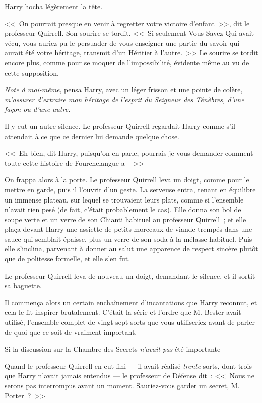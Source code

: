 Harry hocha légèrement la tête.

<<~On pourrait presque en venir à regretter votre victoire d'enfant~>>, dit le professeur Quirrell. Son sourire se tordit. <<~Si seulement Vous-Savez-Qui avait vécu, vous auriez pu le persuader de vous enseigner une partie du savoir qui aurait été votre héritage, transmit d'un Héritier à l'autre.~>> Le sourire se tordit encore plus, comme pour se moquer de l'impossibilité, évidente même au vu de cette supposition.

\emph{Note à moi-même}, pensa Harry, avec un léger frisson et une pointe de colère, \emph{m'assurer d'extraire mon héritage de l'esprit du Seigneur des Ténèbres, d'une façon ou d'une autre.}

Il y eut un autre silence. Le professeur Quirrell regardait Harry comme s'il attendait à ce que ce dernier lui demande quelque chose.

<<~Eh bien, dit Harry, puisqu'on en parle, pourrais-je vous demander comment toute cette histoire de Fourchelangue a -~>>

On frappa alors à la porte. Le professeur Quirrell leva un doigt, comme pour le mettre en garde, puis il l'ouvrit d'un geste. La serveuse entra, tenant en équilibre un immense plateau, sur lequel se trouvaient leurs plats, comme si l'ensemble n'avait rien pesé (de fait, c'était probablement le cas). Elle donna son bol de soupe verte et un verre de son Chianti habituel au professeur Quirrell~; et elle plaça devant Harry une assiette de petits morceaux de viande trempés dans une sauce qui semblait épaisse, plus un verre de son soda à la mélasse habituel. Puis elle s'inclina, parvenant à donner au salut une apparence de respect sincère plutôt que de politesse formelle, et elle s'en fut.

Le professeur Quirrell leva de nouveau un doigt, demandant le silence, et il sortit sa baguette.

Il commença alors un certain enchaînement d'incantations que Harry reconnut, et cela le fit inspirer brutalement. C'était la série et l'ordre que M. Bester avait utilisé, l'ensemble complet de vingt-sept sorts que vous utiliseriez avant de parler de quoi que ce soit de vraiment important.

Si la discussion sur la Chambre des Secrets \emph{n'avait pas} été importante -

Quand le professeur Quirrell en eut fini — il avait réalisé \emph{trente} sorts, dont trois que Harry n'avait jamais entendus — le professeur de Défense dit~: <<~Nous ne serons pas interrompus avant un moment. Sauriez-vous garder un secret, M. Potter~?~>>

